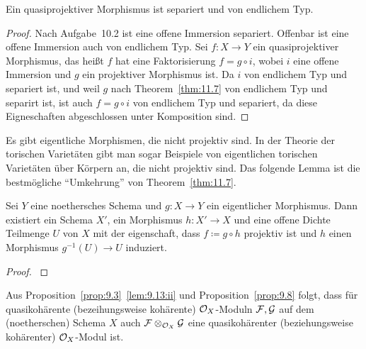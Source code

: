 \begin{kor}
\label{kor:11.8}
	Ein quasiprojektiver Morphismus ist separiert und von endlichem Typ.
	\begin{proof}
		Nach Aufgabe~10.2 ist eine offene Immersion separiert. Offenbar ist eine offene Immersion auch von endlichem Typ. Sei $f\colon X \to Y$ ein quasiprojektiver Morphismus, das heißt $f$ hat eine Faktorisierung $f=g\circ i$, wobei $i$ eine offene Immersion und $g$ ein projektiver Morphismus ist. Da $i$ von endlichem Typ und separiert ist, und weil $g$ nach Theorem~\ref{thm:11.7} von endlichem Typ und separirt ist, ist auch $f=g\circ i$ von endlichem Typ und separiert, da diese Eigneschaften abgeschlossen unter Komposition sind.
	\end{proof}
\end{kor}

Es gibt eigentliche Morphismen, die nicht projektiv sind. In der Theorie der torischen Varietäten gibt man sogar Beispiele von eigentlichen torischen Varietäten über Körpern an, die nicht projektiv sind. Das folgende Lemma ist die bestmögliche \enquote{Umkehrung} von Theorem~\ref{thm:11.7}.

\begin{lem}
\label{lem:11.9}
	Sei $Y$ eine noethersches Schema und $g \colon X \to Y$ ein eigentlicher Morphismus. Dann existiert ein Schema $X'$, ein Morphismus $h\colon X' \to X$ und eine offene Dichte Teilmenge $U$ von $X$ mit der eigenschaft, dass $f \coloneqq g \circ h$ projektiv ist und $h$ einen Morphismus $g^{-1}(U)\to U$ induziert.
	\begin{center}
	\end{center}
	\begin{proof}
		\cite[{}5.6]{grothendieck1961elements}
	\end{proof}
\end{lem}

\begin{bem}
\label{bem:11.10}
	Aus Proposition~\ref{prop:9.3}~\ref{lem:9.13:ii} und Proposition~\ref{prop:9.8} folgt, dass für quasikohärente (bezeihungsweise kohärente) $\mathcal{O}_X$-Moduln $\mathcal{F}, \mathcal{G}$ auf dem (noetherschen) Schema $X$ auch $\mathcal{F}\otimes_{\mathcal{O}_X}\mathcal{G}$ eine quasikohärenter (beziehungsweise kohärenter) $\mathcal{O}_X$-Modul ist.
\end{bem}

